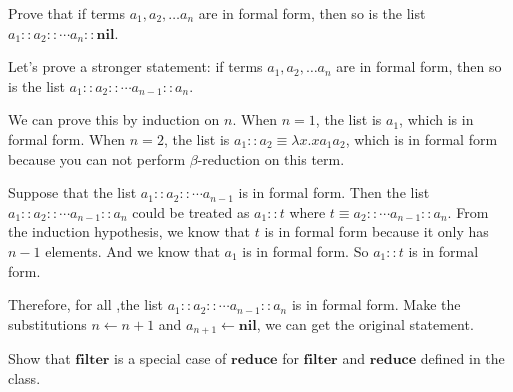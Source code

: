 \documentclass{homework}
\begin{document}
\begin{problem}
  Prove that if terms $a_{1}, a_{2}, \ldots a_{n}$ are in formal form, then so
  is the list $a_{1} :: a_{2} :: \cdots a_{n} :: \mathbf{nil}$.
\end{problem}

\begin{solution}

  Let's prove a stronger statement:
  if terms $a_{1}, a_{2}, \ldots a_{n}$ are in formal form,
  then so is the list $a_{1} :: a_{2} :: \cdots a_{n-1} :: a_{n}$.

  We can prove this by induction on $n$.
  When $n = 1$, the list is $a_{1}$, which is in formal form.
  When $n = 2$, the list is $a_{1} :: a_{2} \equiv \lambda x.xa_1a_2$,
  which is in formal form because you can not perform \(\beta\)-reduction on this term.
 
  Suppose that the list $a_{1} :: a_{2} :: \cdots a_{n-1}$ is in formal form.
  Then the list $a_{1} :: a_{2} :: \cdots a_{n-1} :: a_{n}$ could be treated as
  $a_1:: t$ where $t \equiv a_{2} :: \cdots a_{n-1} :: a_{n}$.
  From the induction hypothesis,
  we know that $t$ is in formal form because it only has $n-1$ elements.
  And we know that $a_1$ is in formal form.
  So $a_1::t$ is in formal form.

  Therefore, for all ,the list $a_{1} :: a_{2} :: \cdots a_{n-1} :: a_{n}$ is in formal form.
  Make the substitutions $n \gets n + 1$ and $a_{n+1} \gets \mathbf{nil}$,
  we can get the original statement.

\end{solution}

\begin{problem}
  Show that $\mathbf{filter}$ is a special case of $\mathbf{reduce}$ for
  $\mathbf{filter}$ and $\mathbf{reduce}$ defined in the class.
\end{problem}
\end{document}
